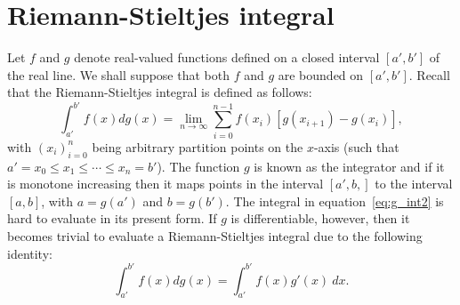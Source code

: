 \documentclass[twoside,reqno,11pt]{fcaa-var} %
\begin{document}
\section{Riemann-Stieltjes integral}
\label{sec:rs}
\noindent
Let $f$ and $g$ denote real-valued functions defined on a closed interval $[a',b']$ of the real line. We shall suppose that both $f$ and $g$ are bounded on $[a',b']$. Recall that the Riemann-Stieltjes integral is defined as follows:
\begin{equation}
\label{eq:g_int2}
\int_{a'}^{b'} f(x) dg(x) =  \lim_{n \rightarrow \infty}\sum_{i=0}^{n-1} f(x_i)[g(x_{i+1})-g(x_{i})], 
\end{equation}
with $(x_i)_{i=0}^n$ being arbitrary partition points on the $x$-axis (such that $a' = x_0 \leq x_1 \leq \cdots \leq x_n = b'$). The function $g$ is known as the integrator and if it is monotone increasing then it maps points in the interval $[a',b,]$ to the interval $[a,b]$, with $a = g(a')$ and $b = g(b')$. The integral in equation~\eqref{eq:g_int2} is hard to evaluate in its present form. If $g$ is differentiable, however, then it becomes trivial to 
evaluate a Riemann-Stieltjes integral due to the following identity:
\begin{equation}
\label{eq:rs_identity}
\int_{a'}^{b'} f(x) dg(x) = \int_{a'}^{b'} f(x)g'(x)~dx.
\end{equation}
\end{document}
